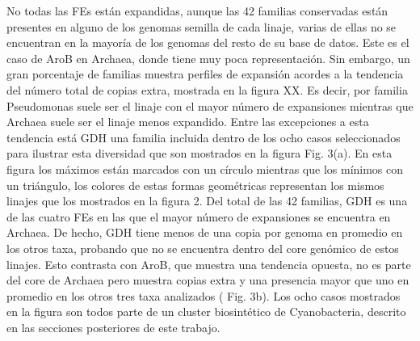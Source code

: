 \documentclass[12pt,twoside]{reedthesis}
\begin{document}
  No todas las FEs están expandidas, aunque las 42 familias conservadas
  están presentes en alguno de los genomas semilla de cada linaje, varias
  de ellas no se encuentran en la mayoría de los genomas del resto de su
  base de datos. Este es el caso de AroB en Archaea, donde tiene muy poca
  representación. Sin embargo, un gran porcentaje de familias muestra
  perfiles de expansión acordes a la tendencia del número total de copias
  extra, mostrada en la figura XX. Es decir, por familia Pseudomonas suele
  ser el linaje con el mayor número de expansiones mientras que Archaea
  suele ser el linaje menos expandido. Entre las excepciones a esta
  tendencia está GDH una familia incluida dentro de los ocho casos
  seleccionados para ilustrar esta diversidad que son mostrados en la
  figura Fig. 3(a). En esta figura los máximos están marcados con un
  círculo mientras que los mínimos con un triángulo, los colores de estas
  formas geométricas representan los mismos linajes que los mostrados en
  la figura 2. Del total de las 42 familias, GDH es una de las cuatro FEs
  en las que el mayor número de expansiones se encuentra en Archaea. De
  hecho, GDH tiene menos de una copia por genoma en promedio en los otros
  taxa, probando que no se encuentra dentro del core genómico de estos
  linajes. Esto contrasta con AroB, que muestra una tendencia opuesta, no
  es parte del core de Archaea pero muestra copias extra y una presencia
  mayor que uno en promedio en los otros tres taxa analizados ( Fig. 3b).
  Los ocho casos mostrados en la figura son todos parte de un cluster
  biosintético de Cyanobacteria, descrito en las secciones posteriores de
  este trabajo.
  
\end{document}
